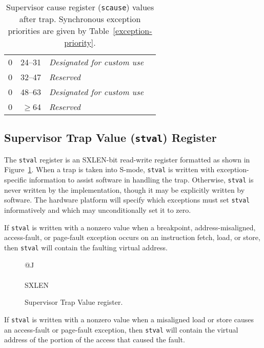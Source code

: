 \begin{table*}[h!]
\begin{center}
\begin{tabular}{|r|r|l|l|}
  0         & 24--31          & {\em Designated for custom use} \\
  0         & 32--47          & {\em Reserved} \\
  0         & 48--63          & {\em Designated for custom use} \\
  0         & $\ge$64         & {\em Reserved} \\
  \hline
\end{tabular}
\end{center}
\caption{Supervisor cause register ({\tt scause}) values after trap.
Synchronous exception priorities are given by Table~\ref{exception-priority}.}
\label{scauses}
\end{table*}

\subsection{Supervisor Trap Value ({\tt stval}) Register}

The {\tt stval} register is an SXLEN-bit read-write register formatted as shown
in Figure~\ref{stvalreg}.  When a trap is taken into S-mode, {\tt stval} is
written with exception-specific information to assist software in handling the
trap.  Otherwise, {\tt stval} is never written by the implementation, though
it may be explicitly written by software.  The hardware platform will specify
which exceptions must set {\tt stval} informatively and which may
unconditionally set it to zero.


If {\tt stval} is written with a nonzero value when a breakpoint,
address-misaligned, access-fault, or page-fault exception occurs on an
instruction fetch, load, or store, then {\tt stval} will contain the faulting
virtual address.

\begin{figure}[h!]
{\footnotesize
\begin{center}
\begin{tabular}{@{}J}
 \\
\hline
{} \\
\hline
SXLEN \\
\end{tabular}
\end{center}
}
\vspace{-0.1in}
\caption{Supervisor Trap Value register.}
\label{stvalreg}
\end{figure}

If {\tt stval} is written with a nonzero value when a misaligned load or store
causes an access-fault or page-fault exception, then {\tt stval} will contain
the virtual address of the portion of the access that caused the fault.

